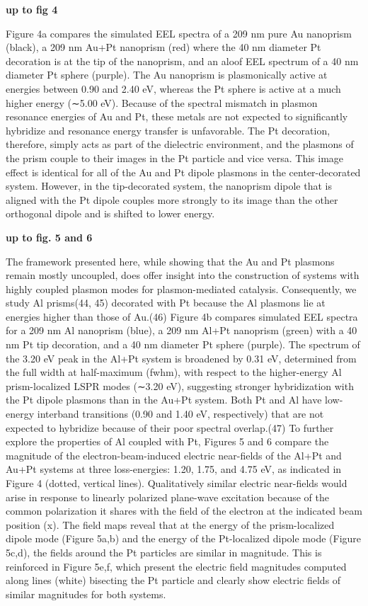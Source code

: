 \documentclass [11pt, proquest] {uwthesis}[2016/11/22]
\begin{document}
{\bf up to fig 4}

Figure 4a compares the simulated EEL spectra of a 209 nm pure Au nanoprism (black), a 209 nm Au+Pt nanoprism (red) where the 40 nm diameter Pt decoration is at the tip of the nanoprism, and an aloof EEL spectrum of a 40 nm diameter Pt sphere (purple). The Au nanoprism is plasmonically active at energies between 0.90 and 2.40 eV, whereas the Pt sphere is active at a much higher energy (∼5.00 eV). Because of the spectral mismatch in plasmon resonance energies of Au and Pt, these metals are not expected to significantly hybridize and resonance energy transfer is unfavorable. The Pt decoration, therefore, simply acts as part of the dielectric environment, and the plasmons of the prism couple to their images in the Pt particle and vice versa. This image effect is identical for all of the Au and Pt dipole plasmons in the center-decorated system. However, in the tip-decorated system, the nanoprism dipole that is aligned with the Pt dipole couples more strongly to its image than the other orthogonal dipole and is shifted to lower energy.

{\bf up to fig. 5 and 6}

The framework presented here, while showing that the Au and Pt plasmons remain mostly uncoupled, does offer insight into the construction of systems with highly coupled plasmon modes for plasmon-mediated catalysis. Consequently, we study Al prisms(44, 45) decorated with Pt because the Al plasmons lie at energies higher than those of Au.(46) Figure 4b compares simulated EEL spectra for a 209 nm Al nanoprism (blue), a 209 nm Al+Pt nanoprism (green) with a 40 nm Pt tip decoration, and a 40 nm diameter Pt sphere (purple). The spectrum of the 3.20 eV peak in the Al+Pt system is broadened by 0.31 eV, determined from the full width at half-maximum (fwhm), with respect to the higher-energy Al prism-localized LSPR modes (∼3.20 eV), suggesting stronger hybridization with the Pt dipole plasmons than in the Au+Pt system. Both Pt and Al have low-energy interband transitions (0.90 and 1.40 eV, respectively) that are not expected to hybridize because of their poor spectral overlap.(47)
To further explore the properties of Al coupled with Pt, Figures 5 and 6 compare the magnitude of the electron-beam-induced electric near-fields of the Al+Pt and Au+Pt systems at three loss-energies: 1.20, 1.75, and 4.75 eV, as indicated in Figure 4 (dotted, vertical lines). Qualitatively similar electric near-fields would arise in response to linearly polarized plane-wave excitation because of the common polarization it shares with the field of the electron at the indicated beam position (x). The field maps reveal that at the energy of the prism-localized dipole mode (Figure 5a,b) and the energy of the Pt-localized dipole mode (Figure 5c,d), the fields around the Pt particles are similar in magnitude. This is reinforced in Figure 5e,f, which present the electric field magnitudes computed along lines (white) bisecting the Pt particle and clearly show electric fields of similar magnitudes for both systems.
\end{document}
